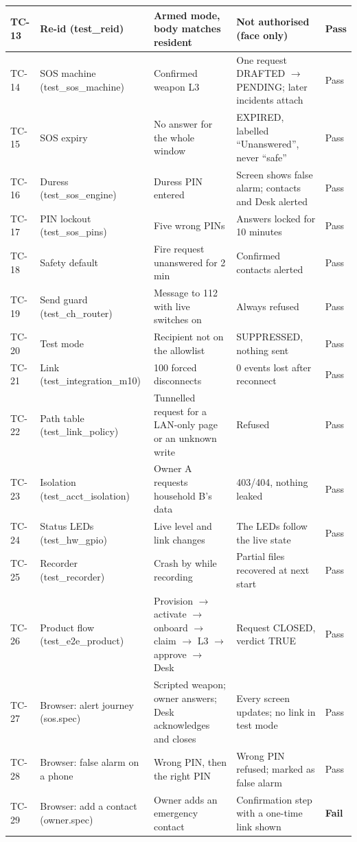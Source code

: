\begin{longtable}{|C{0.95cm}|L{2.8cm}|L{4.1cm}|L{3.4cm}|C{0.95cm}|}
TC-13 & Re-id (test\_reid) & Armed mode, body matches resident & Not authorised (face only) & Pass\\ \hline
TC-14 & SOS machine (test\_sos\_machine) & Confirmed weapon L3 & One request DRAFTED $\to$ PENDING; later incidents attach & Pass\\ \hline
TC-15 & SOS expiry & No answer for the whole window & EXPIRED, labelled ``Unanswered'', never ``safe'' & Pass\\ \hline
TC-16 & Duress (test\_sos\_engine) & Duress PIN entered & Screen shows false alarm; contacts and Desk alerted & Pass\\ \hline
TC-17 & PIN lockout (test\_sos\_pins) & Five wrong PINs & Answers locked for 10 minutes & Pass\\ \hline
TC-18 & Safety default & Fire request unanswered for 2 min & Confirmed contacts alerted & Pass\\ \hline
TC-19 & Send guard (test\_ch\_router) & Message to 112 with live switches on & Always refused & Pass\\ \hline
TC-20 & Test mode & Recipient not on the allowlist & SUPPRESSED, nothing sent & Pass\\ \hline
TC-21 & Link (test\_integration\_m10) & 100 forced disconnects & 0 events lost after reconnect & Pass\\ \hline
TC-22 & Path table (test\_link\_policy) & Tunnelled request for a LAN-only page or an unknown write & Refused & Pass\\ \hline
TC-23 & Isolation (test\_acct\_isolation) & Owner A requests household B's data & 403/404, nothing leaked & Pass\\ \hline
TC-24 & Status LEDs (test\_hw\_gpio) & Live level and link changes & The LEDs follow the live state & Pass\\ \hline
TC-25 & Recorder (test\_recorder) & Crash by  while recording & Partial files recovered at next start & Pass\\ \hline
TC-26 & Product flow (test\_e2e\_product) & Provision $\to$ activate $\to$ onboard $\to$ claim $\to$ L3 $\to$ approve $\to$ Desk & Request CLOSED, verdict TRUE & Pass\\ \hline
TC-27 & Browser: alert journey (sos.spec) & Scripted weapon; owner answers; Desk acknowledges and closes & Every screen updates; no  link in test mode & Pass\\ \hline
TC-28 & Browser: false alarm on a phone & Wrong PIN, then the right PIN & Wrong PIN refused; marked as false alarm & Pass\\ \hline
TC-29 & Browser: add a contact (owner.spec) & Owner adds an emergency contact & Confirmation step with a one-time link shown & \textbf{Fail}\\ \hline
\end{longtable}
\endgroup

